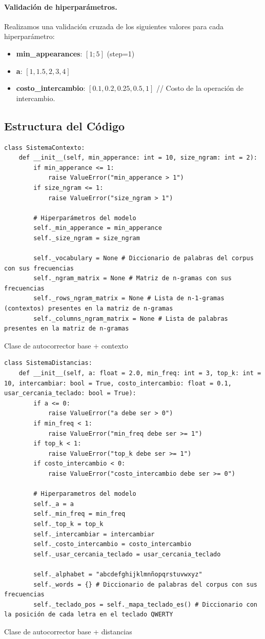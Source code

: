 \documentclass[12pt,a4paper]{article}
\begin{document}
\paragraph{Validación de hiperparámetros.}
Realizamos una validación cruzada de los siguientes valores para cada hiperparámetro:
\begin{itemize}
    \item \textbf{min\_appearances}: $[1;5]$ (step=1)
    \item \textbf{a}: $[1, 1.5, 2, 3, 4]$
    \item \textbf{costo\_intercambio}: $[0.1, 0.2, 0.25, 0.5, 1]$ // Costo de la operación de intercambio.
\end{itemize}

 \subsection{Estructura del Código}
\begin{lstlisting}
class SistemaContexto:
    def __init__(self, min_apperance: int = 10, size_ngram: int = 2):
        if min_apperance <= 1:
            raise ValueError("min_apperance > 1")
        if size_ngram <= 1:
            raise ValueError("size_ngram > 1")

        # Hiperparámetros del modelo
        self._min_apperance = min_apperance
        self._size_ngram = size_ngram
        
        self._vocabulary = None # Diccionario de palabras del corpus con sus frecuencias
        self._ngram_matrix = None # Matriz de n-gramas con sus frecuencias
        self._rows_ngram_matrix = None # Lista de n-1-gramas (contextos) presentes en la matriz de n-gramas
        self._columns_ngram_matrix = None # Lista de palabras presentes en la matriz de n-gramas
\end{lstlisting}{Clase de autocorrector base + contexto}

\clearpage

\begin{lstlisting}
class SistemaDistancias:
    def __init__(self, a: float = 2.0, min_freq: int = 3, top_k: int = 10, intercambiar: bool = True, costo_intercambio: float = 0.1, usar_cercania_teclado: bool = True):
        if a <= 0:
            raise ValueError("a debe ser > 0")
        if min_freq < 1:
            raise ValueError("min_freq debe ser >= 1")
        if top_k < 1:
            raise ValueError("top_k debe ser >= 1")
        if costo_intercambio < 0:
            raise ValueError("costo_intercambio debe ser >= 0")

        # Hiperparametros del modelo
        self._a = a
        self._min_freq = min_freq
        self._top_k = top_k
        self._intercambiar = intercambiar
        self._costo_intercambio = costo_intercambio
        self._usar_cercania_teclado = usar_cercania_teclado

        self._alphabet = "abcdefghijklmnñopqrstuvwxyz"
        self._words = {} # Diccionario de palabras del corpus con sus frecuencias
        self._teclado_pos = self._mapa_teclado_es() # Diccionario con la posición de cada letra en el teclado QWERTY
\end{lstlisting}{Clase de autocorrector base + distancias}
\end{document}
